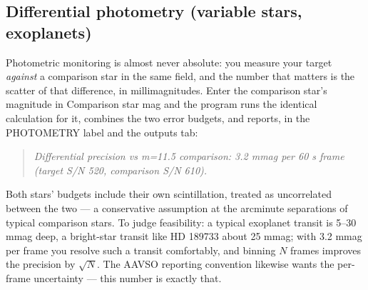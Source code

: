 \subsection{Differential photometry (variable stars, exoplanets)}

Photometric monitoring is almost never absolute: you measure your target
\emph{against} a comparison star in the same field, and the number that
matters is the scatter of that difference, in millimagnitudes. Enter the
comparison star's magnitude in \textsf{Comparison star mag} and the
program runs the identical calculation for it, combines the two error
budgets, and reports, in the PHOTOMETRY label and the outputs tab:

\begin{quote}
\emph{Differential precision vs m=11.5 comparison: 3.2 mmag per 60 s
frame (target S/N 520, comparison S/N 610).}
\end{quote}

Both stars' budgets include their own scintillation, treated as
uncorrelated between the two --- a conservative assumption at the
arcminute separations of typical comparison stars. To judge feasibility:
a typical exoplanet transit is 5--30 mmag deep, a bright-star transit
like HD 189733 about 25 mmag; with 3.2 mmag per frame you resolve such a
transit comfortably, and binning $N$ frames improves the precision by
$\sqrt{N}$. The AAVSO reporting convention likewise wants the per-frame
uncertainty --- this number is exactly that.
